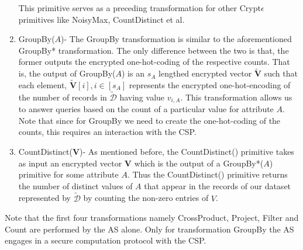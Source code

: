\begin{enumerate}
    This primitive serves as a preceding transformation for other Crypt$\epsilon$ primitives like NoisyMax, CountDistinct et al.
     \item{GroupBy($A$)-} The GroupBy transformation is similar to the aforementioned GroupBy* transformation. The only difference between the two is that, the former outputs the encrypted one-hot-coding of the respective counts. That is, the output of GroupBy($A$)  is an $s_A$ lengthed encrypted vector $\tilde{\mathbf{V}}$ such that each element, $\tilde{\mathbf{V}}[i], i \in [s_A]$ represents the encrypted one-hot-encoding of the number of records in $\boldsymbol{\tilde{\mathcal{D}}}$ having value $v_{i,A}$. This transformation allows us to answer queries based on the count of a particular value for attribute $A$.
     Note that since for GroupBy we need to create the one-hot-coding of the counts, this requires an interaction with the CSP.
     \item {CountDistinct($\mathbf{V}$)-} As mentioned before, the CountDistinct() primitive takes as input an encrypted vector $\mathbf{V}$ which is the output of a GroupBy*($A$) primitive for some attribute $A$. Thus the CountDistinct() primitive  returns the number of distinct values of $A$ that appear in the records of our dataset represented by $\boldsymbol{\tilde{\mathcal{D}}}$ by counting the non-zero entries of $V$.  
\end{enumerate}
Note that the first four transformations namely CrossProduct, Project, Filter and Count are performed by the AS alone. Only for transformation GroupBy the AS engages in a secure computation protocol with the CSP.
